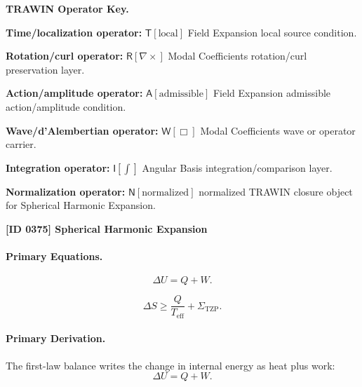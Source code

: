 \par\vspace{0.45\baselineskip}
\noindent\begin{minipage}[t]{\linewidth}
\begingroup
\small
\raggedright
\textbf{TRAWIN Operator Key.}\par
\noindent\textbf{Time/localization operator:} $\mathsf{T}\!\left[\mathrm{local}\right]$ Field Expansion local source condition.\par
\noindent\textbf{Rotation/curl operator:} $\mathsf{R}\!\left[\nabla\times\right]$ Modal Coefficients rotation/curl preservation layer.\par
\noindent\textbf{Action/amplitude operator:} $\mathsf{A}\!\left[\mathrm{admissible}\right]$ Field Expansion admissible action/amplitude condition.\par
\noindent\textbf{Wave/d'Alembertian operator:} $\mathsf{W}\!\left[\Box\right]$ Modal Coefficients wave or operator carrier.\par
\noindent\textbf{Integration operator:} $\mathsf{I}\!\left[\int\right]$ Angular Basis integration/comparison layer.\par
\noindent\textbf{Normalization operator:} $\mathsf{N}\!\left[\mathrm{normalized}\right]$ normalized TRAWIN closure object for Spherical Harmonic Expansion.\par
\endgroup
\end{minipage}

\clearpage
\noindent\textbf{[ID 0375] Spherical Harmonic Expansion}\par
\vspace{0.35em}
\paragraph{Primary Equations.}
\begin{equation}
\Delta U = Q+W .
\end{equation}

\begin{equation}
\Delta S
\geq
\frac{Q}{T_{\mathrm{eff}}}
+
\Sigma_{\mathrm{TZP}} .
\end{equation}

\paragraph{Primary Derivation.}
The first-law balance writes the change in internal energy as heat plus work:
\begin{equation}
\Delta U=Q+W .
\end{equation}

